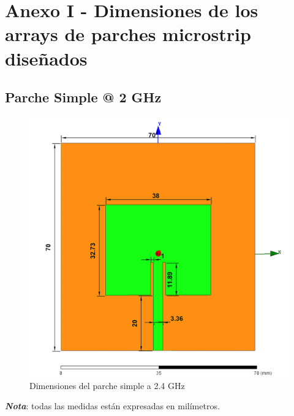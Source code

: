 
\chapter{Anexo I - Dimensiones de los arrays de parches microstrip diseñados}
\label{anexo}


\section{Parche Simple @ 2 GHz}

\vfill
\begin{figure}[H]
   	 \centering
        \includegraphics[width=\textwidth ,height=\textheight, keepaspectratio=true]{archivos/desarrollo/autocad/1}
        \caption{Dimensiones del parche simple a 2.4 GHz}
        \label{fig:simple1}
\end{figure}
\vfill
\textit{\textbf{Nota}}: todas las medidas están expresadas en milímetros.
\newpage


